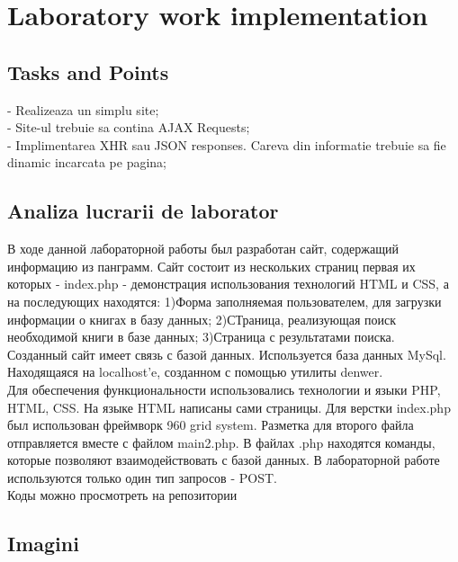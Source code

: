\section{Laboratory work implementation}

\subsection{Tasks and Points}

- Realizeaza un simplu site; \\
\indent 
- Site-ul trebuie sa contina AJAX Requests; \\
\indent 
- Implimentarea XHR sau JSON responses. Careva din informatie trebuie sa fie dinamic incarcata pe pagina;

\subsection{Analiza lucrarii de laborator}
В ходе данной лабораторной работы был разработан сайт, содержащий информацию из панграмм. Сайт состоит из нескольких страниц первая их которых - index.php - демонстрация использования технологий HTML и CSS, а на последующих находятся: 1)Форма заполняемая пользователем, для загрузки информации о книгах в базу данных; 2)СТраница, реализующая поиск необходимой книги в базе данных; 3)Страница с результатами поиска.\\
\indent 
Созданный сайт имеет связь с базой данных. Используется база данных MySql. Находящаяся на localhost'e, созданном с помощью утилиты denwer.\\
\indent 
Для обеспечения функциональности использовались технологии и языки PHP, HTML, CSS. На языке HTML написаны сами страницы. Для верстки index.php был использован фреймворк 960 grid system. Разметка для второго файла отправляется вместе с файлом main2.php. В файлах .php находятся команды, которые позволяют взаимодействовать с базой данных. В лабораторной работе используются только один тип запросов - POST. \\
\indent 
Коды можно просмотреть на репозитории 



\subsection{Imagini}

